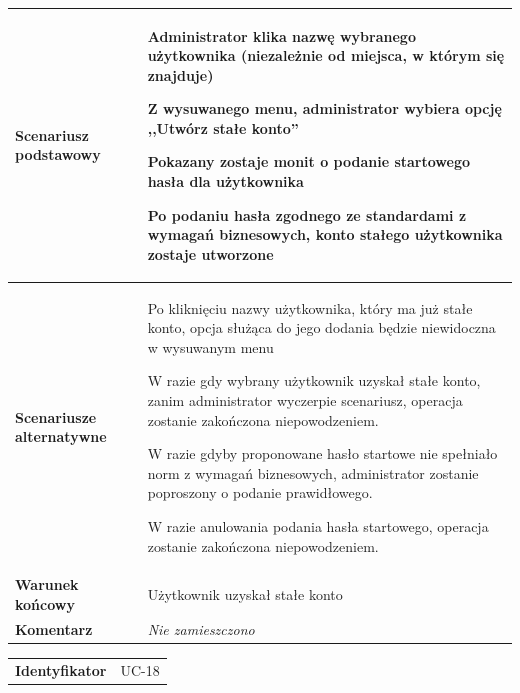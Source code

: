 {\begin{tabular}{ | l | l | }
	\hline
		\parbox[t]{4cm}{\textbf{Scenariusz podstawowy}} & \parbox[t]{11cm}{
			\begin{enumreq}
				\item Administrator klika nazwę wybranego użytkownika
				(niezależnie od miejsca, w którym się znajduje)
				\item Z wysuwanego menu, administrator wybiera opcję
				,,Utwórz stałe konto''
				\item Pokazany zostaje monit o podanie startowego hasła
				dla użytkownika
				\item Po podaniu hasła zgodnego ze standardami z wymagań
				biznesowych, konto stałego użytkownika zostaje utworzone
			\end{enumreq}
		}
		\\
		
	\hline
		\parbox[t]{4cm}{\textbf{Scenariusze alternatywne}} & \parbox[t]
		{11cm}{
			\begin{enumreq}
				\item Po kliknięciu nazwy użytkownika, który ma już stałe
				konto, opcja służąca do jego dodania będzie niewidoczna
				w wysuwanym menu
				\item W razie gdy wybrany użytkownik uzyskał stałe konto,
				zanim administrator wyczerpie scenariusz, operacja zostanie
				zakończona niepowodzeniem.
				\item W razie gdyby proponowane hasło startowe nie spełniało
				norm z wymagań biznesowych, administrator zostanie poproszony
				o podanie prawidłowego.
				\item W razie anulowania podania hasła startowego, operacja
				zostanie zakończona niepowodzeniem.
			\end{enumreq}
		}
		\\
		
	\hline
		\parbox[t]{4cm}{\textbf{Warunek końcowy}} & \parbox[t]{11cm}{
			Użytkownik uzyskał stałe konto
		}
		\\
		
	\hline
		\parbox[t]{4cm}{\textbf{Komentarz}} & \parbox[t]{11cm}{
			\textit{Nie zamieszczono}
		}
		\\

	\hline
\end{tabular}

\vspace{2em}

\begin{tabular}{ | l | l | }
	\hline
		\textbf{Identyfikator} & 
		UC-18
		\\
		

\end{tabular}}
